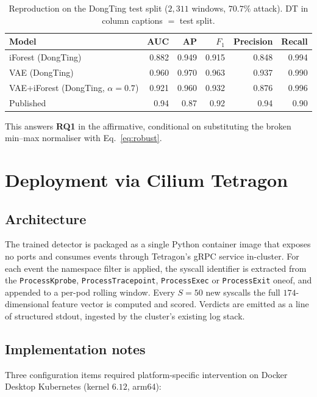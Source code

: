\begin{table}[!t]
\centering
\caption{Reproduction on the DongTing test split ($2{,}311$ windows,
$70.7\%$ attack). DT in column captions $=$ test split.}
\label{tab:repro}
\begin{tabular}{lrrrrr}
\toprule
Model & AUC & AP & $F_{1}$ & Precision & Recall \\
\midrule
iForest (DongTing)                       & 0.882 & 0.949 & 0.915 & 0.848 & 0.994 \\
VAE (DongTing)                           & 0.960 & 0.970 & 0.963 & 0.937 & 0.990 \\
VAE+iForest (DongTing, $\alpha=0.7$)     & 0.921 & 0.960 & 0.932 & 0.876 & 0.996 \\
\midrule
Published~\cite{desfam2025}              & 0.94  & 0.87  & 0.92  & 0.94  & 0.90  \\
\bottomrule
\end{tabular}
\end{table}

This answers \textbf{RQ1} in the affirmative, conditional on
substituting the broken min--max normaliser with
Eq.~\ref{eq:robust}.

\FloatBarrier
\section{Deployment via Cilium Tetragon}
\label{sec:deployment}

\subsection{Architecture}
The trained detector is packaged as a single Python container image
that exposes no ports and consumes events through Tetragon's gRPC
service in-cluster. For each event the namespace filter is applied,
the syscall identifier is extracted from the
\texttt{ProcessKprobe}, \texttt{ProcessTracepoint},
\texttt{ProcessExec} or \texttt{ProcessExit} oneof, and appended to a
per-pod rolling window. Every $S=50$ new syscalls the full
$174$-dimensional feature vector is computed and scored. Verdicts
are emitted as a line of structured stdout, ingested by the
cluster's existing log stack.

\subsection{Implementation notes}
Three configuration items required platform-specific intervention on
Docker Desktop Kubernetes (kernel $6.12$, arm64):

